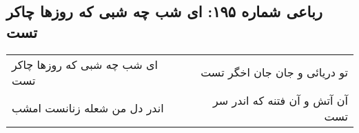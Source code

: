 \begin{center}
\section*{رباعی شماره ۱۹۵: ای شب چه شبی که روزها چاکر تست}
\label{sec:0195}
\begin{longtable}{l p{0.5cm} r}
ای شب چه شبی که روزها چاکر تست
&&
تو دریائی و جان جان اخگر تست
\\
اندر دل من شعله زنانست امشب
&&
آن آتش و آن فتنه که اندر سر تست
\\
\end{longtable}
\end{center}
